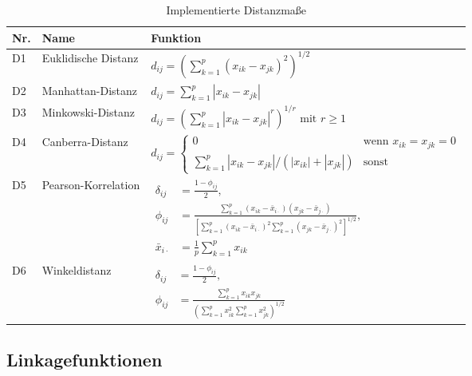 \documentclass[12pt]{article}
\begin{document}
\begin{table}[ht]
	\centering
	\renewcommand{\arraystretch}{1.3}
	\begin{tabularx}{\textwidth}{l >{\raggedright\arraybackslash}p{3cm} X}
		\toprule
		Nr. & Name & Funktion \\
		\midrule
		D1  & Euklidische Distanz & $ d_{ij} = \left( \sum_{k=1}^{p} (x_{ik} - x_{jk})^2 \right)^{1/2} $\\
		\midrule
		D2  & Manhattan-Distanz   & $ d_{ij} =  \sum_{k=1}^{p} |x_{ik} - x_{jk}| $ \\
		\midrule
		D3  & Minkowski-Distanz   & $ d_{ij} = \left( \sum_{k=1}^{p} |x_{ik} - x_{jk}|^r \right)^{1/r} \text{ mit } r \ge 1 $ \\
		\midrule
		D4  & Canberra-Distanz    & $ d_{ij} = \begin{cases}
			0 & \text{wenn }x_{ik} = x_{jk} = 0\\
			\sum_{k=1}^{p} |x_{ik} - x_{jk}|/(|x_{ik}| + |x_{jk}|)  & \text{sonst}
		\end{cases}  $\\
		\midrule
		D5  & Pearson-Korrelation & $ \begin{aligned}
			\delta_{ij}
			&= \frac{1-\phi_{ij}}{2},
			\\[0.5ex]
			\phi_{ij}
			&=
			\frac{
				\sum_{k=1}^{p}
				(x_{ik} - \bar{x}_{i\cdot})
				(x_{jk} - \bar{x}_{j\cdot})
			}{
				\left[
				\sum_{k=1}^{p}
				(x_{ik} - \bar{x}_{i\cdot})^2
				\sum_{k=1}^{p}
				(x_{jk} - \bar{x}_{j\cdot})^2
				\right]^{1/2}
			},
			\\[0.5ex]
			\bar{x}_{i\cdot}
			&=
			\frac{1}{p}\sum_{k=1}^{p} x_{ik}
		\end{aligned} $\\
		\midrule
		D6  & Winkeldistanz       & $ \begin{aligned}
			\delta_{ij}
			&= \frac{1-\phi_{ij}}{2},
			\\[0.5ex]
			\phi_{ij}
			&=
			\frac{
				\sum_{k=1}^{p} x_{ik}x_{jk}
			}{
				\left(
				\sum_{k=1}^{p} x_{ik}^2
				\sum_{k=1}^{p} x_{jk}^2
				\right)^{1/2}
			}
		\end{aligned} $ \\
		\bottomrule
	\end{tabularx}
	\caption{Implementierte Distanzmaße}
	\label{distanzfunktionen-tabelle}
\end{table}

\subsection{Linkagefunktionen}
\label{linkage-funktionen}
\end{document}

